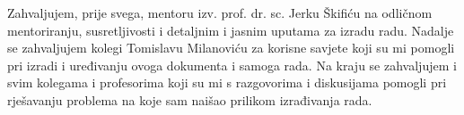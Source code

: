 \vspace{5pt}

\begin{flushleft}
\noindent Zahvaljujem, prije svega, mentoru izv. prof. dr. sc. Jerku Škifiću na odličnom mentoriranju, susretljivosti i detaljnim i jasnim uputama za izradu radu. Nadalje se zahvaljujem kolegi Tomislavu Milanoviću za korisne savjete koji su mi pomogli pri izradi i uređivanju ovoga dokumenta i samoga rada. Na kraju se zahvaljujem i svim kolegama i profesorima koji su mi s razgovorima i diskusijama pomogli pri rješavanju problema na koje sam naišao prilikom izrađivanja rada.
\end{flushleft}